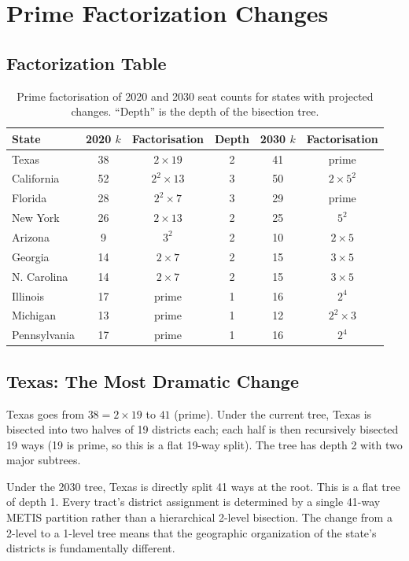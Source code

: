 \section{Prime Factorization Changes}
\label{sec:factorization}

\subsection{Factorization Table}

\begin{table}[h]
\centering
\caption{Prime factorisation of 2020 and 2030 seat counts for states
         with projected changes. ``Depth'' is the depth of the \ar{}
         bisection tree.}
\label{tab:factorization}
\begin{tabular}{lccccc}
\toprule
State & 2020 $k$ & Factorisation & Depth & 2030 $k$ & Factorisation \\
\midrule
Texas & 38 & $2 \times 19$ & 2 & 41 & prime \\
California & 52 & $2^2 \times 13$ & 3 & 50 & $2 \times 5^2$ \\
Florida & 28 & $2^2 \times 7$ & 3 & 29 & prime \\
New York & 26 & $2 \times 13$ & 2 & 25 & $5^2$ \\
Arizona & 9 & $3^2$ & 2 & 10 & $2 \times 5$ \\
Georgia & 14 & $2 \times 7$ & 2 & 15 & $3 \times 5$ \\
N. Carolina & 14 & $2 \times 7$ & 2 & 15 & $3 \times 5$ \\
Illinois & 17 & prime & 1 & 16 & $2^4$ \\
Michigan & 13 & prime & 1 & 12 & $2^2 \times 3$ \\
Pennsylvania & 17 & prime & 1 & 16 & $2^4$ \\
\bottomrule
\end{tabular}
\end{table}

\subsection{Texas: The Most Dramatic Change}

Texas goes from $38 = 2 \times 19$ to $41$ (prime).
Under the current tree, Texas is bisected into two halves of 19 districts each;
each half is then recursively bisected 19 ways (19 is prime, so this is a
flat 19-way split).
The tree has depth 2 with two major subtrees.

Under the 2030 tree, Texas is directly split 41 ways at the root.
This is a flat tree of depth 1.
Every tract's district assignment is determined by a single 41-way
METIS partition rather than a hierarchical 2-level bisection.
The change from a 2-level to a 1-level tree means that the geographic
organization of the state's districts is fundamentally different.

